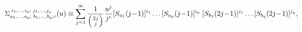 \begin{equation}
\Sigma_{a_1,\ldots,a_p;
\; b_1,\ldots,b_q;c}^{\; i_1,\ldots,i_p; \;j_1,\ldots,j_q}(u)
\equiv
\sum_{j=1}^\infty \frac{1}{\left( 2j \atop j\right) } \frac{u^j}{j^c}
[S_{a_1}(j\!-\!1)]^{i_1}\ldots [S_{a_p}(j\!-\!1)]^{i_p}\;
[S_{b_1}(2j\!-\!1)]^{j_1}\ldots [S_{b_q}(2j\!-\!1)]^{j_q},
\label{binsum}
\end{equation}

